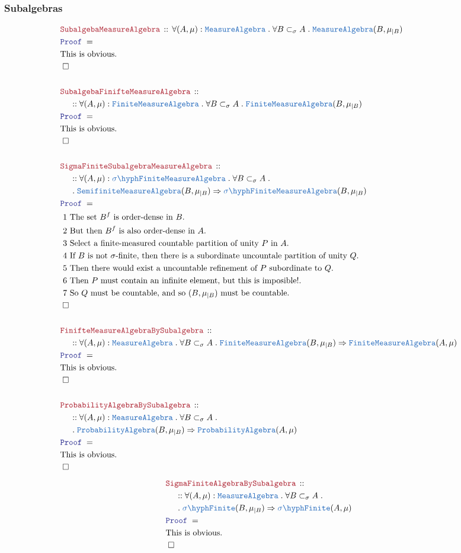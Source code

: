 \documentclass[12pt]{scrartcl}
\newcommand{\TYPE}[1]{\textcolor{NavyBlue}{\mathtt{#1}}}
\newcommand{\LOGIC}[1]{\textcolor{Blue}{\mathtt{#1}}}
\newcommand{\THM}[1]{\textcolor{Maroon}{\mathtt{#1}}}
\renewcommand{\.}{\; . \;}
\newcommand{\Theorem}[2]{& \THM{#1} \, :: \, #2 \\ & \Proof = \\ }
\newcommand{\NewLine}{\\ & \kern 1pc}
\newcommand{\Page}[1]{ \begin{align*} #1 \end{align*}   }
\newcommand{\Imply}{\Rightarrow}
\newcommand{\QED}{\; \square}
\newcommand{\EndProof}{& \QED \\}
\newcommand{\Proof}{\LOGIC{Proof} \; }
\newcommand{\Explain}[1]{& \text{#1.} \\}
\newcommand{\Finite}{\TYPE{Finite}}
\newcommand{\sFinite}{\TYPE{\sigma \hyph  Finite}}
\newcommand{\Semifinite}{\TYPE{Semifinite}}
\newcommand{\MA}{\TYPE{MeasureAlgebra}}
\begin{document}
\subsubsection{Subalgebras}
\Page{
	\Theorem{SubalgebaMeasureAlgebra}
	{
		\forall (A,\mu) : \MA \.
		\forall B \subset_\sigma A \.
		\MA(B,\mu_{|B})
	}
	\Explain{This is obvious}
	\EndProof
	\\
	\Theorem{SubalgebaFinifteMeasureAlgebra}
	{
		\NewLine ::		
		\forall (A,\mu) : \Finite\MA \.
		\forall B \subset_\sigma A \.
		\Finite\MA(B,\mu_{|B})
	}
	\Explain{This is obvious}
	\EndProof
	\\
	\Theorem{SigmaFiniteSubalgebraMeasureAlgebra}
	{
		\NewLine ::		
		\forall (A,\mu) : \sFinite\MA \.
		\forall B \subset_\sigma A \. \NewLine \.
		\Semifinite\MA(B,\mu_{|B}) \Imply
		\sFinite\MA(B,\mu_{|B})
	}
	\Explain{ 1 The set $B^f$ is order-dense in $B$}
	\Explain{ 2 But then $B^f$ is also order-dense in $A$}
	\Explain{ 3 Select a finite-measured countable partition of unity $P$ in $A$}
	\Explain{  4 If $B$ is not $\sigma$-finite, then there is a subordinate uncountale partition of unity $Q$}	
	\Explain{ 5 Then there would exist 
		a uncountable refinement of $P$ subordinate to $Q$}
	\Explain{ 6 Then $P$ must contain an infinite element, but this is imposible!}
	\Explain{ 7 So $Q$ must be countable, and so $(B,\mu_{|B})$ must be countable}
	\EndProof
	\\
	\Theorem{FinifteMeasureAlgebraBySubalgebra}
	{
		\NewLine ::		
		\forall (A,\mu) : \MA \.
		\forall B \subset_\sigma A \.
		\Finite\MA(B,\mu_{|B}) \Imply \Finite\MA(A,\mu)
	}
	\Explain{This is obvious}
	\EndProof
	\\
	\Theorem{ProbabilityAlgebraBySubalgebra}
	{
		\NewLine ::		
		\forall (A,\mu) : \MA \.
		\forall B \subset_\sigma A \. \NewLine \.
		\TYPE{ProbabilityAlgebra}(B,\mu_{|B}) \Imply \TYPE{ProbabilityAlgebra}(A,\mu)
	}
	\Explain{This is obvious}
	\EndProof
}\Page{
	\Theorem{SigmaFiniteAlgebraBySubalgebra}
	{
		\NewLine ::		
		\forall (A,\mu) : \MA \.
		\forall B \subset_\sigma A \. \NewLine \.
		\sFinite(B,\mu_{|B}) \Imply \sFinite(A,\mu)
	}
	\Explain{This is obvious}
	\EndProof
}
\newpage
\end{document}

